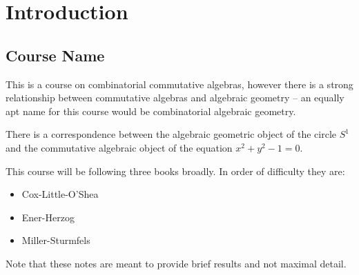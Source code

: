 \newpage
\section{Introduction \label{sec:intro}}
\subsection{Course Name}

This is a course on combinatorial commutative algebras, however there is a strong relationship between commutative algebras and algebraic geometry -- an equally apt name for this course would be combinatorial algebraic geometry.

\begin{example}
There is a correspondence between the algebraic geometric object of the circle $S^1$ and the commutative algebraic object of the equation $x^2 + y^2 - 1 =0$.
\end{example}

This course will be following three books broadly. In order of difficulty they are:
\begin{itemize}
    \item Cox-Little-O'Shea
    \item Ener-Herzog
    \item Miller-Sturmfels
\end{itemize}


Note that these notes are meant to provide brief results and not maximal detail.





